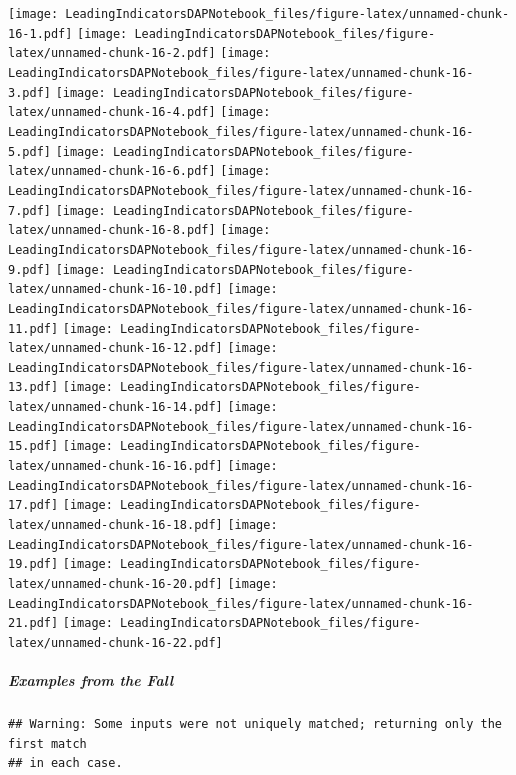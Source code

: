 \documentclass[]{article}
\let\oldsubparagraph\subparagraph
\renewcommand{\subparagraph}[1]{\oldsubparagraph{#1}\mbox{}}
\begin{document}
\texttt{[image: LeadingIndicatorsDAPNotebook\_files/figure-latex/unnamed-chunk-16-1.pdf]}
\texttt{[image: LeadingIndicatorsDAPNotebook\_files/figure-latex/unnamed-chunk-16-2.pdf]}
\texttt{[image: LeadingIndicatorsDAPNotebook\_files/figure-latex/unnamed-chunk-16-3.pdf]}
\texttt{[image: LeadingIndicatorsDAPNotebook\_files/figure-latex/unnamed-chunk-16-4.pdf]}
\texttt{[image: LeadingIndicatorsDAPNotebook\_files/figure-latex/unnamed-chunk-16-5.pdf]}
\texttt{[image: LeadingIndicatorsDAPNotebook\_files/figure-latex/unnamed-chunk-16-6.pdf]}
\texttt{[image: LeadingIndicatorsDAPNotebook\_files/figure-latex/unnamed-chunk-16-7.pdf]}
\texttt{[image: LeadingIndicatorsDAPNotebook\_files/figure-latex/unnamed-chunk-16-8.pdf]}
\texttt{[image: LeadingIndicatorsDAPNotebook\_files/figure-latex/unnamed-chunk-16-9.pdf]}
\texttt{[image: LeadingIndicatorsDAPNotebook\_files/figure-latex/unnamed-chunk-16-10.pdf]}
\texttt{[image: LeadingIndicatorsDAPNotebook\_files/figure-latex/unnamed-chunk-16-11.pdf]}
\texttt{[image: LeadingIndicatorsDAPNotebook\_files/figure-latex/unnamed-chunk-16-12.pdf]}
\texttt{[image: LeadingIndicatorsDAPNotebook\_files/figure-latex/unnamed-chunk-16-13.pdf]}
\texttt{[image: LeadingIndicatorsDAPNotebook\_files/figure-latex/unnamed-chunk-16-14.pdf]}
\texttt{[image: LeadingIndicatorsDAPNotebook\_files/figure-latex/unnamed-chunk-16-15.pdf]}
\texttt{[image: LeadingIndicatorsDAPNotebook\_files/figure-latex/unnamed-chunk-16-16.pdf]}
\texttt{[image: LeadingIndicatorsDAPNotebook\_files/figure-latex/unnamed-chunk-16-17.pdf]}
\texttt{[image: LeadingIndicatorsDAPNotebook\_files/figure-latex/unnamed-chunk-16-18.pdf]}
\texttt{[image: LeadingIndicatorsDAPNotebook\_files/figure-latex/unnamed-chunk-16-19.pdf]}
\texttt{[image: LeadingIndicatorsDAPNotebook\_files/figure-latex/unnamed-chunk-16-20.pdf]}
\texttt{[image: LeadingIndicatorsDAPNotebook\_files/figure-latex/unnamed-chunk-16-21.pdf]}
\texttt{[image: LeadingIndicatorsDAPNotebook\_files/figure-latex/unnamed-chunk-16-22.pdf]}

\hypertarget{examples-from-the-fall-1}{%
\subparagraph{Examples from the Fall}\label{examples-from-the-fall-1}}

\begin{verbatim}
## Warning: Some inputs were not uniquely matched; returning only the first match
## in each case.
\end{verbatim}
\end{document}

